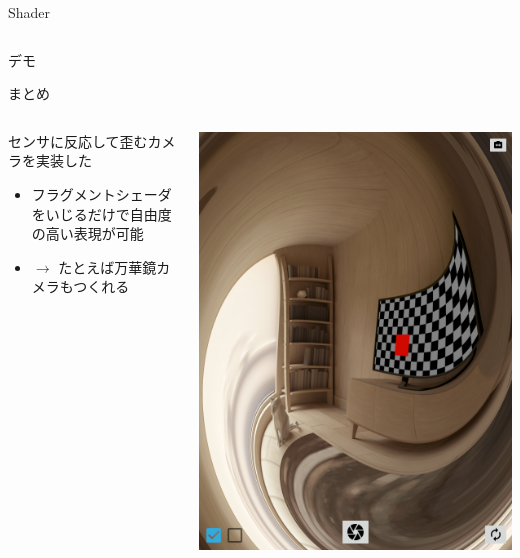 \documentclass[dvipdfmx,12pt]{beamer}
\begin{document}
\begin{frame}{Shader}
\begin{columns}[c]
\begin{column}{0.3\linewidth}
\begin{center}
      \end{center}
    \end{column}
  \end{columns}
\end{frame}


{
  \begin{frame}[c]
    \begin{center}
      \Large デモ
    \end{center}
  \end{frame}
}


\begin{frame}{まとめ}
  \begin{columns}[c]
    \begin{column}{0.7\linewidth}
      センサに反応して歪むカメラを実装した
      \begin{itemize}
        \item フラグメントシェーダをいじるだけで自由度の高い表現が可能
        \item $\rightarrow$ たとえば万華鏡カメラもつくれる
      \end{itemize}
    \end{column}
    \begin{column}{0.3\linewidth}
      \begin{center}
        \includegraphics[width=\linewidth]{fig/screenshot.png}
      \end{center}
    \end{column}
  \end{columns}
\end{frame}
\end{document}
